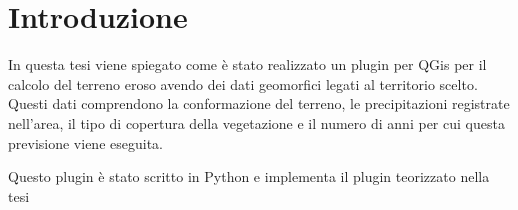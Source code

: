 
\cleardoublepage
{}

\chapter*{Introduzione}

In questa tesi viene spiegato come è stato realizzato un plugin per QGis per il calcolo del terreno eroso avendo dei dati geomorfici legati al territorio scelto. Questi dati comprendono la conformazione del terreno, le precipitazioni registrate nell'area, il tipo di copertura della vegetazione e il numero di anni per cui questa previsione viene eseguita.

Questo plugin è stato scritto in Python e implementa il plugin teorizzato nella tesi \cite{tesi:ambientale}